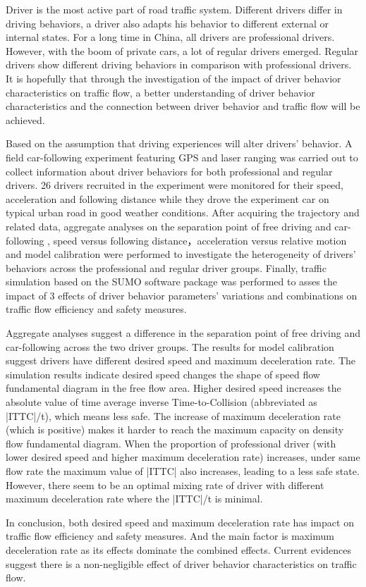 
Driver is the most active part of road traffic system. Different drivers differ in driving behaviors, a driver also adapts his behavior to different external or internal states. For a long time in China, all drivers are professional drivers. However, with the boom of private cars, a lot of regular drivers emerged. Regular drivers show different driving behaviors in comparison with professional drivers. It is hopefully that through the investigation of the impact of driver behavior characteristics on traffic flow, a better understanding of driver behavior characteristics and the connection between driver behavior and traffic flow will be achieved.



Based on the assumption that driving experiences will alter drivers' behavior. A field car-following experiment featuring GPS and laser ranging was carried out to collect information about driver behaviors for both professional and regular drivers. 26 drivers recruited in the experiment were monitored for their speed, acceleration and following distance while they drove the experiment car on typical urban road in good weather conditions. After acquiring the trajectory and related data, aggregate analyses on the separation point of free driving and car-following , speed versus following distance，acceleration versus relative motion and model calibration were performed to investigate the heterogeneity of drivers' behaviors across the professional and regular driver groups. Finally, traffic simulation based on the SUMO software package was performed to asses the impact of 3 effects of driver behavior parameters' variations and combinations on traffic flow efficiency and safety measures.



Aggregate analyses suggest a difference in the separation point of free driving and car-following across the two driver groups. The results for model calibration suggest drivers have different desired speed and maximum deceleration rate. The simulation results indicate desired speed changes the shape of speed flow fundamental diagram in the free flow area. Higher desired speed increases the absolute value of time average inverse Time-to-Collision (abbreviated as |ITTC|/t), which means less safe. The increase of maximum deceleration rate (which is positive) makes it harder to reach the maximum capacity on density flow fundamental diagram. When the proportion of professional driver (with lower desired speed and higher maximum deceleration rate) increases, under same flow rate the maximum value of |ITTC| also increases, leading to a less safe state. However, there seem to be an optimal mixing rate of driver with different maximum deceleration rate where the |ITTC|/t is minimal.



In conclusion, both desired speed and maximum deceleration rate has impact on traffic flow efficiency and safety measures. And the main factor is maximum deceleration rate as its effects dominate the combined effects. Current evidences suggest there is a non-negligible effect of driver behavior characteristics on traffic flow.
